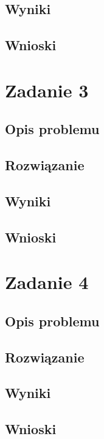 \documentclass{article}
\begin{document}
\begin{center}
    \subsection{Wyniki}

    \subsection{Wnioski}

    \section{Zadanie 3}
    \subsection{Opis problemu}

    \subsection{Rozwiązanie}

    \subsection{Wyniki}

    \subsection{Wnioski}

    \section{Zadanie 4}
    \subsection{Opis problemu}

    \subsection{Rozwiązanie}

    \subsection{Wyniki}

    \subsection{Wnioski}


\end{center}
\end{document}
